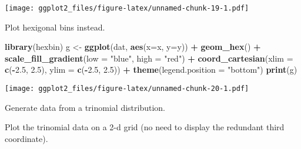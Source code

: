 \documentclass[]{article}
\newenvironment{Shaded}{\begin{snugshade}}{\end{snugshade}}
\newcommand{\KeywordTok}[1]{\textcolor[rgb]{0.13,0.29,0.53}{\textbf{#1}}}
\newcommand{\DataTypeTok}[1]{\textcolor[rgb]{0.13,0.29,0.53}{#1}}
\newcommand{\DecValTok}[1]{\textcolor[rgb]{0.00,0.00,0.81}{#1}}
\newcommand{\FloatTok}[1]{\textcolor[rgb]{0.00,0.00,0.81}{#1}}
\newcommand{\StringTok}[1]{\textcolor[rgb]{0.31,0.60,0.02}{#1}}
\newcommand{\OperatorTok}[1]{\textcolor[rgb]{0.81,0.36,0.00}{\textbf{#1}}}
\newcommand{\NormalTok}[1]{#1}
\begin{document}
\texttt{[image: ggplot2\_files/figure-latex/unnamed-chunk-19-1.pdf]}

Plot hexigonal bins instead.

\begin{Shaded}
\begin{Highlighting}[]
\KeywordTok{library}\NormalTok{(hexbin)}
\NormalTok{g <-}\StringTok{ }\KeywordTok{ggplot}\NormalTok{(dat, }\KeywordTok{aes}\NormalTok{(}\DataTypeTok{x=}\NormalTok{x, }\DataTypeTok{y=}\NormalTok{y)) }\OperatorTok{+}
\StringTok{    }\KeywordTok{geom_hex}\NormalTok{() }\OperatorTok{+}
\StringTok{    }\KeywordTok{scale_fill_gradient}\NormalTok{(}\DataTypeTok{low =} \StringTok{"blue"}\NormalTok{, }\DataTypeTok{high =} \StringTok{"red"}\NormalTok{) }\OperatorTok{+}
\StringTok{    }\KeywordTok{coord_cartesian}\NormalTok{(}\DataTypeTok{xlim =} \KeywordTok{c}\NormalTok{(}\OperatorTok{-}\FloatTok{2.5}\NormalTok{, }\FloatTok{2.5}\NormalTok{), }\DataTypeTok{ylim =} \KeywordTok{c}\NormalTok{(}\OperatorTok{-}\FloatTok{2.5}\NormalTok{, }\FloatTok{2.5}\NormalTok{)) }\OperatorTok{+}
\StringTok{    }\KeywordTok{theme}\NormalTok{(}\DataTypeTok{legend.position =} \StringTok{"bottom"}\NormalTok{)}
\KeywordTok{print}\NormalTok{(g)}
\end{Highlighting}
\end{Shaded}

\texttt{[image: ggplot2\_files/figure-latex/unnamed-chunk-20-1.pdf]}

Generate data from a trinomial distribution.

\begin{Shaded}
\end{Shaded}

Plot the trinomial data on a 2-d grid (no need to display the redundant
third coordinate).
\end{document}
